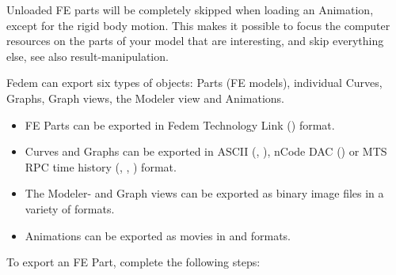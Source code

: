 
Unloaded FE parts will be completely skipped when loading an Animation,
except for the rigid body motion. This makes it possible to focus the
computer resources on the parts of your model that are interesting,
and skip everything else, see also
{result-manipulation}.



Fedem can export six types of objects: Parts (FE models), individual
Curves, Graphs, Graph views, the Modeler view and Animations.

\begin{itemize}
\item FE Parts can be exported in Fedem Technology Link () format.
\item Curves and Graphs can be exported in ASCII (, ),
  nCode DAC () or MTS RPC time history (, ,
  ) format.
\item The Modeler- and Graph views can be exported as binary image files
  in a variety of formats.
\item Animations can be exported as movies
  in  and  formats.
\end{itemize}



To export an FE Part, complete the following steps:

